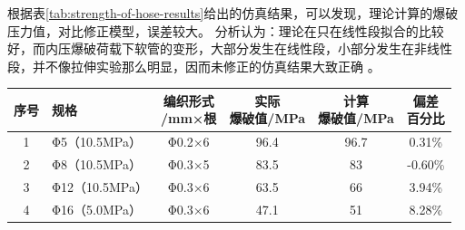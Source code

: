 \begin{figure}[!htp]
	\centering
	\hspace{0.5cm}
	\label{fig:stress}
\end{figure}


根据表\ref{tab:strength-of-hose-results}给出的仿真结果，可以发现，\ha 理论计算的爆破压力值，对比修正模型，误差较大。
分析认为：\ha 理论在只在线性段拟合的比较好，而内压爆破荷载下软管的变形，大部分发生在线性段，小部分发生在非线性段，并不像拉伸实验那么明显，因而\ha 未修正的仿真结果大致正确 。








\begin{table}[!htb]
	\centering
	\label{tab:strength-of-hose}
	\begin{tabular}{@{\extracolsep{\fill}}>{\hspace{0.5cm}}clcccc}
		\toprule
		序号 &    规格     & \tabincell{c}{编织形式\\/mm×根 }& \tabincell{c}{实际\\爆破值/MPa }& \tabincell{c}{计算\\爆破值/MPa}& \tabincell{c}{偏差\\百分比}  \\ \midrule
		1  & Φ5（10.5MPa）  & Φ0.2×6  &   96.4    & 96.7          & 0.31\% \\
		2  & Φ8（10.5MPa）  & Φ0.3×5  &   83.5    & 83          & -0.60\% \\
		3  & Φ12（10.5MPa） & Φ0.3×6  &   63.5    & 66          & 3.94\%  \\
		4  & Φ16（5.0MPa）  & Φ0.3×6  &   47.1    & 51          & 8.28\% \\ \bottomrule
	\end{tabular} 
	\end{table}  

